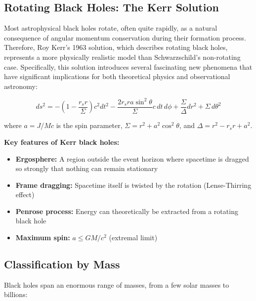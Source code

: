 \documentclass[11pt,a4paper]{article}
\begin{document}
\subsection{Rotating Black Holes: The Kerr Solution}

Most astrophysical black holes rotate, often quite rapidly, as a natural consequence of angular momentum conservation during their formation process. Therefore, Roy Kerr's 1963 solution, which describes rotating black holes, represents a more physically realistic model than Schwarzschild's non-rotating case. Specifically, this solution introduces several fascinating new phenomena that have significant implications for both theoretical physics and observational astronomy:

\begin{equationbox}
\begin{equation}
ds^2 = -\left(1 - \frac{r_s r}{\Sigma}\right)c^2 dt^2 - \frac{2r_s r a \sin^2\theta}{\Sigma} c \, dt \, d\phi + \frac{\Sigma}{\Delta} dr^2 + \Sigma \, d\theta^2
\end{equation}
\end{equationbox}

where $a = J/Mc$ is the spin parameter, $\Sigma = r^2 + a^2\cos^2\theta$, and $\Delta = r^2 - r_s r + a^2$.

\textbf{Key features of Kerr black holes:}

\begin{itemize}[noitemsep]
    \item \textbf{Ergosphere:} A region outside the event horizon where spacetime is dragged so strongly that nothing can remain stationary
    \item \textbf{Frame dragging:} Spacetime itself is twisted by the rotation (Lense-Thirring effect)
    \item \textbf{Penrose process:} Energy can theoretically be extracted from a rotating black hole
    \item \textbf{Maximum spin:} $a \leq GM/c^2$ (extremal limit)
\end{itemize}

\subsection{Classification by Mass}

Black holes span an enormous range of masses, from a few solar masses to billions:
\end{document}

